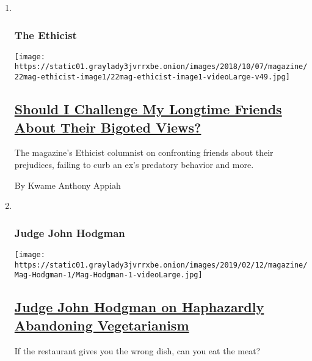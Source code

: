 \begin{enumerate}
\def\labelenumi{\arabic{enumi}.}
\item ~
  \hypertarget{the-ethicist}{%
  \subsubsection{The Ethicist}\label{the-ethicist}}

  \texttt{[image: https://static01.graylady3jvrrxbe.onion/images/2018/10/07/magazine/22mag-ethicist-image1/22mag-ethicist-image1-videoLarge-v49.jpg]}

  \hypertarget{should-i-challenge-my-longtime-friends-about-their-bigoted-views}{%
  \subsection{\texorpdfstring{\href{/2019/09/17/magazine/should-i-challenge-my-longtime-friends-about-their-bigoted-views.html}{Should
  I Challenge My Longtime Friends About Their Bigoted
  Views?}}{Should I Challenge My Longtime Friends About Their Bigoted Views?}}\label{should-i-challenge-my-longtime-friends-about-their-bigoted-views}}

  The magazine's Ethicist columnist on confronting friends about their
  prejudices, failing to curb an ex's predatory behavior and more.

  By Kwame Anthony Appiah
\item ~
  \hypertarget{judge-john-hodgman}{%
  \subsubsection{Judge John Hodgman}\label{judge-john-hodgman}}

  \texttt{[image: https://static01.graylady3jvrrxbe.onion/images/2019/02/12/magazine/Mag-Hodgman-1/Mag-Hodgman-1-videoLarge.jpg]}

  \hypertarget{judge-john-hodgman-on-haphazardly-abandoning-vegetarianism}{%
  \subsection{\texorpdfstring{\href{/2019/09/19/magazine/judge-john-hodgman-on-haphazardly-abandoning-vegetarianism.html}{Judge
  John Hodgman on Haphazardly Abandoning
  Vegetarianism}}{Judge John Hodgman on Haphazardly Abandoning Vegetarianism}}\label{judge-john-hodgman-on-haphazardly-abandoning-vegetarianism}}

  If the restaurant gives you the wrong dish, can you eat the meat?


\end{enumerate}
